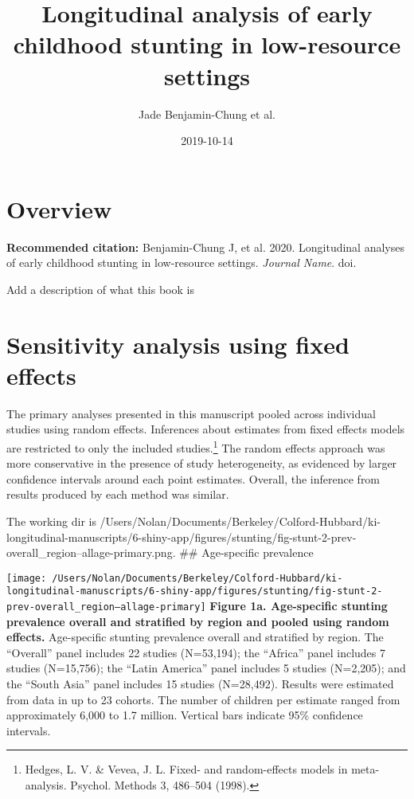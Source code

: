 \documentclass[9pt,]{book}
\title{Longitudinal analysis of early childhood stunting in low-resource
settings}
\author{Jade Benjamin-Chung et al.}
\date{2019-10-14}
\let\rmarkdownfootnote\footnote%
\def\footnote{\protect\rmarkdownfootnote}
\begin{document}
\maketitle

{
\setcounter{tocdepth}{1}
\tableofcontents
}
\chapter{Overview}\label{overview}

\textbf{Recommended citation:} Benjamin-Chung J, et al. 2020.
Longitudinal analyses of early childhood stunting in low-resource
settings. \emph{Journal Name}. doi.

Add a description of what this book is

\chapter{Sensitivity analysis using fixed effects}\label{fixed-effects}

\raggedright

The primary analyses presented in this manuscript pooled across
individual studies using random effects. Inferences about estimates from
fixed effects models are restricted to only the included
studies.\footnote{Hedges, L. V. \& Vevea, J. L. Fixed- and
  random-effects models in meta-analysis. Psychol. Methods 3, 486--504
  (1998).} The random effects approach was more conservative in the
presence of study heterogeneity, as evidenced by larger confidence
intervals around each point estimates. Overall, the inference from
results produced by each method was similar.

The working dir is
/Users/Nolan/Documents/Berkeley/Colford-Hubbard/ki-longitudinal-manuscripts/6-shiny-app/figures/stunting/fig-stunt-2-prev-overall\_region--allage-primary.png.
\#\# Age-specific prevalence

\texttt{[image: /Users/Nolan/Documents/Berkeley/Colford-Hubbard/ki-longitudinal-manuscripts/6-shiny-app/figures/stunting/fig-stunt-2-prev-overall\_region--allage-primary]}
\textbf{Figure 1a. Age-specific stunting prevalence overall and
stratified by region and pooled using random effects. } Age-specific
stunting prevalence overall and stratified by region. The ``Overall''
panel includes 22 studies (N=53,194); the ``Africa'' panel includes 7
studies (N=15,756); the ``Latin America'' panel includes 5 studies
(N=2,205); and the ``South Asia'' panel includes 15 studies (N=28,492).
Results were estimated from data in up to 23 cohorts. The number of
children per estimate ranged from approximately 6,000 to 1.7 million.
Vertical bars indicate 95\% confidence intervals.
\end{document}
